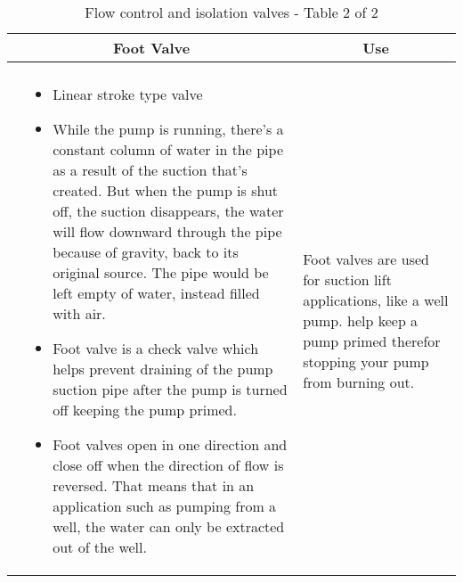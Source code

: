 \begin{landscape}
\begin{table}
\begin{tabular}{| m{7cm} m{10cm} | m{7cm} | }
    \\ \hline
\multicolumn{2}{c}{Foot Valve} & \multicolumn{1}{c}{Use}\\ \hline
    \begin{minipage}{.3\textwidth}
   \vspace{-2em} 
     \texttt{[image: FootValve1]}\\
    \end{minipage}
    &
  \scriptsize{\begin{itemize}[topsep=5pt, partopsep=0pt]
  \item Linear stroke type valve \item While the pump is running, there’s a constant column of water in the pipe as a result of the suction that’s created. But when the pump is shut off, the suction disappears, the water will flow downward through the pipe because of gravity, back to its original source. The pipe would be left empty of water, instead filled with air.\item Foot valve is a check valve which helps prevent draining of the pump suction pipe after the pump is turned off keeping the pump primed. \item Foot valves open in one direction and close off when the direction of flow is reversed. That means that in an application such as pumping from a well, the water can only be extracted out of the well. 

  \end{itemize}}  
    &
        \vspace{0.4cm}
      \begin{itemize}[leftmargin=*]
      \scriptsize{
        \item Foot valves are used for suction lift applications, like a well pump. help keep a pump primed therefor stopping your pump from burning out.}
      \end{itemize}
  
    \\ \hline
   \end{tabular}
   \caption{Flow control and isolation valves - Table 2 of 2} 
      \label{table:Valve2}  
\end{table}

\end{landscape}

